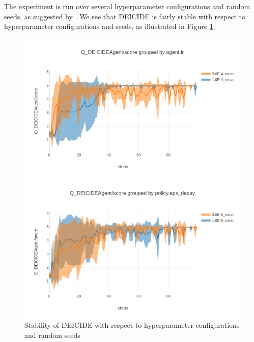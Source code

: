 The experiment is run over several hyperparameter configurations and
random seeds, as suggested by \citet{henderson2018deep}. We see that
DEICIDE is fairly stable with respect to hyperparameter configurations
and seeds, as illustrated in Figure \ref{fig:exp:cartpole:stability}.

\begin{figure}[h]
  \centering
  \newcommand{\cartpolestabilityscale}[0]{0.34}
  \begin{minipage}{0.49\linewidth}
    \includegraphics[scale=\cartpolestabilityscale]{results/ct-fd-cartpole-lr}
  \end{minipage}
  \begin{minipage}{0.49\linewidth}
    \includegraphics[scale=\cartpolestabilityscale]{results/ct-fd-cartpole-epsdecay}
  \end{minipage}
  \caption{Stability of DEICIDE with respect to hyperparameter
    configurations and random seeds}
  \label{fig:exp:cartpole:stability}
\end{figure}

